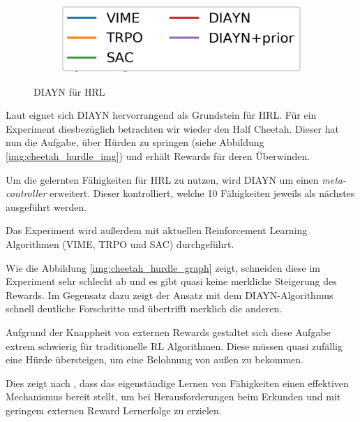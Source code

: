 \begin{figure}[h]
\begin{subfigure}{0.2\textwidth}
\includegraphics[width=\textwidth, keepaspectratio=true]{images/cheetah_hurdle_exp.JPG}
\end{subfigure}
\caption{DIAYN für HRL} \label{img:cheetah_hurdle}
\end{figure}

Laut \cite{diversity_eysenbach} eignet sich DIAYN hervorrangend als Grundstein für HRL. Für ein Experiment diesbezüglich betrachten wir wieder den Half Cheetah. Dieser hat nun die Aufgabe, über Hürden zu springen (siehe Abbildung \ref{img:cheetah_hurdle_img}) und erhält Rewards für deren Überwinden.

Um die gelernten Fähigkeiten für HRL zu nutzen, wird DIAYN um einen \textit{meta-controller} erweitert. Dieser kontrolliert, welche 10 Fähigkeiten jeweils als nächstes ausgeführt werden.

Das Experiment wird außerdem mit aktuellen Reinforcement Learning Algorithmen (VIME, TRPO und SAC) durchgeführt.

Wie die Abbildung \ref{img:cheetah_hurdle_graph} zeigt, schneiden diese im Experiment sehr schlecht ab und es gibt quasi keine merkliche Steigerung des Rewards. Im Gegensatz dazu zeigt der Ansatz mit dem DIAYN-Algorithmus schnell deutliche Forschritte und übertrifft merklich die anderen.

Aufgrund der Knappheit von externen Rewards gestaltet sich diese Aufgabe extrem schwierig für traditionelle RL Algorithmen. Diese müssen quasi zufällig eine Hürde übersteigen, um eine Belohnung von außen zu bekommen.

Dies zeigt nach \cite{diversity_eysenbach}, dass das eigenständige Lernen von Fähigkeiten einen effektiven Mechanismus bereit stellt, um bei Herausforderungen beim Erkunden und mit geringem externen Reward Lernerfolge zu erzielen.

